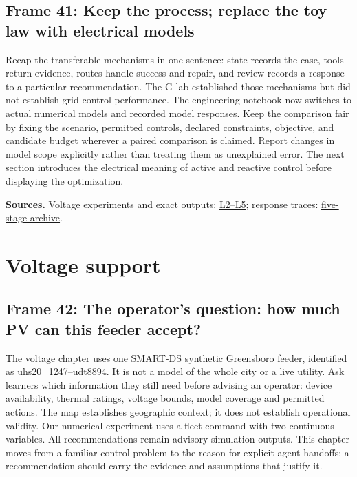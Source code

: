 \documentclass[11pt]{article}
\begin{document}
\subsection*{Frame 41: Keep the process; replace the toy law with electrical models}
Recap the transferable mechanisms in one sentence: state records the case, tools return evidence, routes handle success and repair, and review records a response to a particular recommendation. The G lab established those mechanisms but did not establish grid-control performance. The engineering notebook now switches to actual numerical models and recorded model responses. Keep the comparison fair by fixing the scenario, permitted controls, declared constraints, objective, and candidate budget wherever a paired comparison is claimed. Report changes in model scope explicitly rather than treating them as unexplained error. The next section introduces the electrical meaning of active and reactive control before displaying the optimization.\par
\par\nopagebreak\begin{minipage}{\linewidth}{\footnotesize\color{slate}\textbf{Sources.} Voltage experiments and exact outputs: \href{../Classroom_Labs.ipynb}{L2--L5}; response traces: \href{../results/proposal_complete_workflow.json}{five-stage archive}.\par}\end{minipage}\par\medskip
\clearpage\section{Voltage support}
\subsection*{Frame 42: The operator's question: how much PV can this feeder accept?}
The voltage chapter uses one SMART-DS synthetic Greensboro feeder, identified as uhs20\_1247--udt8894. It is not a model of the whole city or a live utility. Ask learners which information they still need before advising an operator: device availability, thermal ratings, voltage bounds, model coverage and permitted actions. The map establishes geographic context; it does not establish operational validity. Our numerical experiment uses a fleet command with two continuous variables. All recommendations remain advisory simulation outputs. This chapter moves from a familiar control problem to the reason for explicit agent handoffs: a recommendation should carry the evidence and assumptions that justify it.\par
\end{document}
